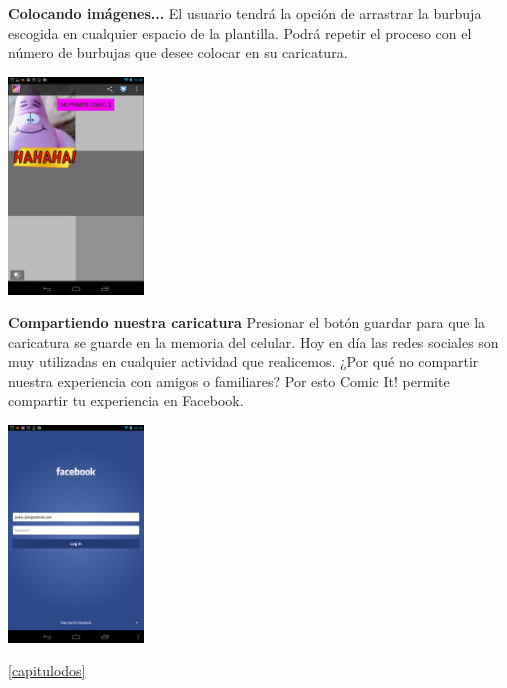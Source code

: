 \documentclass[12pt]{report}
\begin{document}


\begingroup
		\large{
			\textbf{
				Colocando imágenes...
				\newline
				\newline
			}
		}
	\endgroup
El usuario tendrá la opción de arrastrar la burbuja escogida en cualquier espacio de la plantilla. Podrá repetir el proceso con el número de burbujas que desee colocar en su caricatura.
\newline


	\begin{center}
		\begingroup
			\includegraphics[width=0.27\textwidth]{imagenes_usuario/comic.png}
		\endgroup
	\end{center}



\begingroup
		\large{
			\textbf{
				Compartiendo nuestra caricatura
				\newline
				\newline
			}
		}
	\endgroup
Presionar el botón guardar para que la caricatura se guarde en la memoria del celular.
Hoy en día las redes sociales son muy utilizadas en cualquier actividad que realicemos. ¿Por qué no compartir nuestra experiencia con amigos o familiares?
Por esto Comic It! permite compartir tu experiencia en Facebook.
\newline

	\begin{center}
		\begingroup
			\includegraphics[width=0.27\textwidth]{imagenes_usuario/face.png}

		\endgroup
	\end{center}


 \ref{capitulodos}
\end{document}
